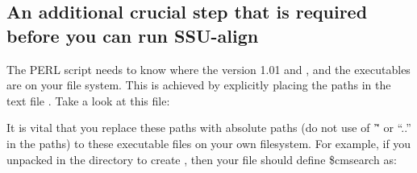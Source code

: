 \subsection{An additional crucial step that is required before you
can run SSU-align}

The  PERL script needs to know where the
 version 1.01  and , and
the   executables are on your file
system. This is achieved by explicitly placing the paths in the text
file . Take a look at this file:


It is vital that you replace these paths with absolute paths (do not 
use of '\~' or ``..'' in the paths) to these executable files on your own
filesystem. For example, if you unpacked  in the 
directory  to create
, then your  file
should define \$cmsearch as: 



